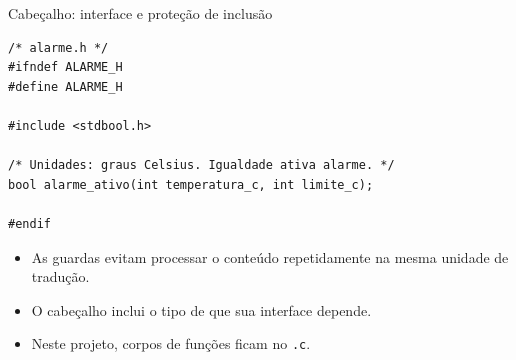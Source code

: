 \begin{frame}[fragile]{Cabeçalho: interface e proteção de inclusão}
\begin{lstlisting}
/* alarme.h */
#ifndef ALARME_H
#define ALARME_H

#include <stdbool.h>

/* Unidades: graus Celsius. Igualdade ativa alarme. */
bool alarme_ativo(int temperatura_c, int limite_c);

#endif
\end{lstlisting}
\begin{itemize}
\item As guardas evitam processar o conteúdo repetidamente na mesma unidade de tradução.
\item O cabeçalho inclui o tipo de que sua interface depende.
\item Neste projeto, corpos de funções ficam no \texttt{.c}.
\end{itemize}
\end{frame}
